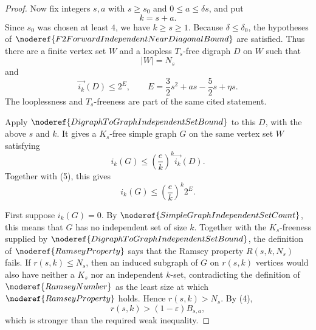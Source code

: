 \begin{proof}
Now fix integers \(s,a\) with \(s\ge s_0\) and \(0\le a\le\delta s\), and
put
\[
  k=s+a.
\]
Since \(s_0\) was chosen at least \(4\), we have \(k\ge s\ge1\). Because
\(\delta\le\delta_0\), the hypotheses of
\(\noderef{F2ForwardIndependentNearDiagonalBound}\) are satisfied. Thus
there are a finite vertex set \(W\) and a loopless \(T_s\)-free digraph
\(D\) on \(W\) such that
\[
  |W|=N_s
\]
and
\[
  \overrightarrow{i_k}(D)\le
  2^E,\qquad
  E=\frac32s^2+as-\frac52s+\eta s. \tag{5}
\]
The looplessness and \(T_s\)-freeness are part of the same cited statement.

Apply \(\noderef{DigraphToGraphIndependentSetBound}\) to this \(D\), with
the above \(s\) and \(k\). It gives a \(K_s\)-free simple graph \(G\) on the
same vertex set \(W\) satisfying
\[
  i_k(G)\le \left(\frac e k\right)^k\overrightarrow{i_k}(D).
\]
Together with (5), this gives
\[
  i_k(G)\le \left(\frac e k\right)^k 2^E. \tag{6}
\]

First suppose \(i_k(G)=0\). By \(\noderef{SimpleGraphIndependentSetCount}\),
this means that \(G\) has no independent set of size \(k\). Together with
the \(K_s\)-freeness supplied by \(\noderef{DigraphToGraphIndependentSetBound}\),
the definition of \(\noderef{RamseyProperty}\) says that the
Ramsey property \(R(s,k,N_s)\) fails. If \(r(s,k)\le N_s\), then an induced
subgraph of \(G\) on \(r(s,k)\) vertices would also have neither a \(K_s\)
nor an independent \(k\)-set, contradicting the definition of
\(\noderef{RamseyNumber}\) as the least size at which
\(\noderef{RamseyProperty}\) holds. Hence \(r(s,k)>N_s\). By (4),
\[
  r(s,k)>(1-\varepsilon)B_{s,a},
\]
which is stronger than the required weak inequality.


\end{proof}
